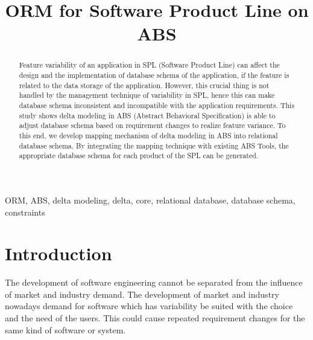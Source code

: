 \documentclass[conference]{IEEEtran}
\begin{document}
%
\title{ORM for Software Product Line on ABS}


\author{
\and
{}
}


\maketitle


\begin{abstract}
Feature variability of an application in SPL (Software Product Line) can affect the design and the implementation of database schema of the application, if the feature is related to the data storage of the application. However, this crucial thing is not handled by the management technique of variability in SPL, hence this can make database schema inconsistent and incompatible with the application requirements. This study shows delta modeling in ABS (Abstract Behavioral Specification) is able to adjust database schema based on requirement changes to realize feature variance. To this end, we develop mapping mechanism of delta modeling in ABS into relational database schema. By integrating the mapping technique with existing ABS Tools, the appropriate database schema for each product of the SPL can be generated.
\end{abstract}

\begin{IEEEkeywords}
ORM, ABS, delta modeling, delta, core, relational database, database schema, constraints
\end{IEEEkeywords}


\section{Introduction}
The development of software engineering cannot be separated from the influence of market and industry demand. The development of market and industry nowadays demand for software which has variability be suited with the choice and the need of the users. This could cause repeated requirement changes for the same kind of software or system.
\end{document}
